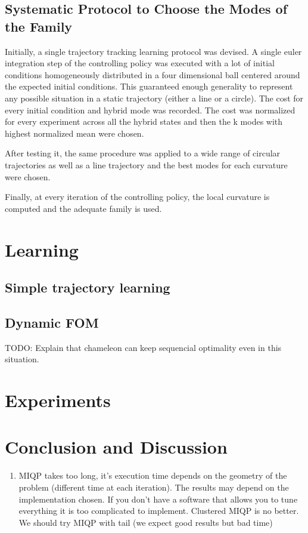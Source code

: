 \documentclass[12,twoside]{TFG-GM}
\theoremstyle{definition}
\theoremstyle{remark}
\begin{document}
\subsection{Systematic Protocol to Choose the Modes of the Family}
Initially, a single trajectory tracking learning protocol was devised. A single euler integration step of the controlling policy was executed with a lot of initial conditions homogeneously distributed in a four dimensional ball centered around the expected initial conditions. This guaranteed enough generality to represent any possible situation in a static trajectory (either a line or a circle). The cost for every initial condition and hybrid mode was recorded. The cost was normalized for every experiment across all the hybrid states and then the k modes with highest normalized mean were chosen.

After testing it, the same procedure was applied to a wide range of circular trajectories as well as a line trajectory and the best modes for each curvature were chosen.

Finally, at every iteration of the controlling policy, the local curvature is computed and the adequate family is used.

\section{Learning}

\subsection{Simple trajectory learning}
\label{subsec:learningsimple}

\subsection{Dynamic FOM}
TODO: Explain that chameleon can keep sequencial optimality even in this situation.

\section{Experiments}
\label{sec:experiments}

\section{Conclusion and Discussion}
\label{sec:conclusion}
\begin{enumerate}
\item{MIQP} takes too long, it's execution time depends on the geometry of the problem (different time at each iteration). The results may depend on the implementation chosen. If you don't have a software that allows you to tune everything it is too complicated to implement. Clustered MIQP is no better. We should try MIQP with tail (we expect good results but bad time)
\end{enumerate}
\end{document}

